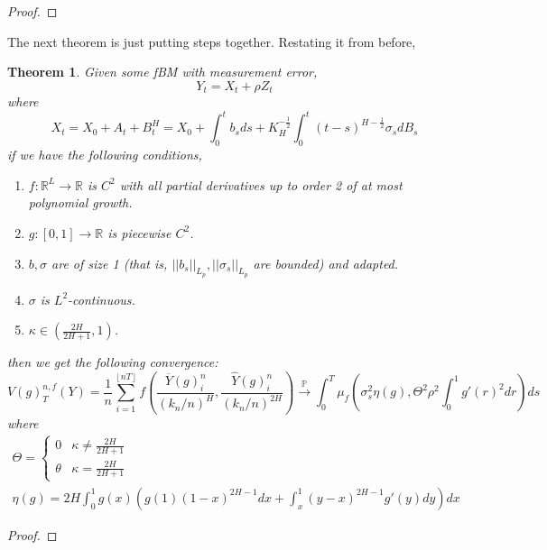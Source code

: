 \documentclass[12pt,letterpaper]{article}
\newtheorem*{theorem}{Theorem}
\theoremstyle{definition}
\newcommand{\R}{\mathbb{R}}
\begin{document}
\begin{proof}
\end{proof}

The next theorem is just putting steps together. Restating it from before,
\begin{theorem}
  Given some fBM with measurement error,
  \begin{equation}
    Y_t = X_t + \rho Z_t
  \end{equation}
  where
  \begin{equation}
    X_t = X_0 + A_t + B_t^H = X_0 + \int_0^tb_sds + K_H^{-\frac{1}{2}}\int_0^t(t-s)^{H - \frac{1}{2}}\sigma_sdB_s
  \end{equation}
  if we have the following conditions, %
  \begin{enumerate}
    \item \(f: \R^L \rightarrow \R\) is \(C^2\) with all partial derivatives up to order 2 of at most polynomial growth.
    \item \(g: [0,1] \rightarrow \R\) is piecewise \(C^2\).
    \item \(b, \sigma\) are of size 1 (that is, \(||b_s||_{L_p}, ||\sigma_s||_{L_p}\) are bounded) and adapted.
    \item \(\sigma\) is \(L^2\)-continuous.
    \item \(\kappa \in \left(\frac{2H}{2H+1}, 1\right)\).
  \end{enumerate}
  then we get the following convergence:
  \begin{equation}
    V(g)^{n,f}_T(Y) = \frac{1}{n}\sum_{i=1}^{\left\lfloor nT \right\rfloor}f\left( \frac{\overline{Y}(g)^n_i}{\left( k_n/n \right)^H}, \frac{\widehat{Y}(g)^n_i}{\left( k_n/n \right)^{2H}} \right) \overset{\mathbb{P}}{\rightarrow} \int_0^T \mu_f\left( \sigma_s^2\eta\left( g \right), \Theta^2\rho^2 \int_0^1g'(r)^2dr \right)ds
  \end{equation}
  where
  \begin{gather}
    \Theta =
    \begin{cases}
      0 & \kappa \neq \frac{2H}{2H+1} \\
      \theta &  \kappa = \frac{2H}{2H+1}
    \end{cases} \\
    \eta(g) = 2H\int_0^1g(x)\left(g(1)(1-x)^{2H-1}dx + \int_x^1(y-x)^{2H-1}g'(y)dy\right)dx
  \end{gather}
\end{theorem}

\begin{proof}

\end{proof}
\end{document}
